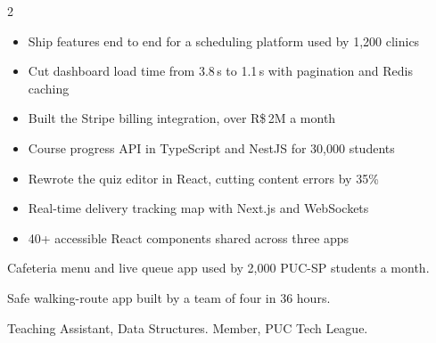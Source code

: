 \documentclass[10pt,letterpaper,ragged2e,withhyper]{altacv}
\begin{document}
\makecvheader
{}
\begin{paracol}{2}

\begin{itemize}
\item Ship features end to end for a scheduling platform used by 1,200 clinics
\item Cut dashboard load time from 3.8\,s to 1.1\,s with pagination and Redis caching
\item Built the Stripe billing integration, over R\$\,2M a month
\end{itemize}

\divider
{}
\begin{itemize}
\item Course progress API in TypeScript and NestJS for 30,000 students
\item Rewrote the quiz editor in React, cutting content errors by 35\%
\end{itemize}

\divider
{}
\begin{itemize}
\item Real-time delivery tracking map with Next.js and WebSockets
\item 40+ accessible React components shared across three apps
\end{itemize}

Cafeteria menu and live queue app used by 2,000 PUC-SP students a month.

\divider
{}
Safe walking-route app built by a team of four in 36 hours.

\switchcolumn

Teaching Assistant, Data Structures. Member, PUC Tech League.



\divider
{}


\divider
{}
\end{paracol}
\end{document}
